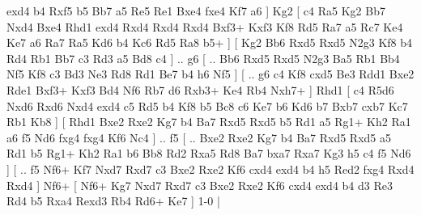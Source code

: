 exd4  b4 Rxf5  b5 Bb7  a5 Re5  Re1 Bxe4  fxe4 Kf7  a6   ]  Kg2 [  c4 Ra5  Kg2 Bb7  Nxd4 Bxe4  Rhd1 exd4  Rxd4 Rxd4  Rxd4 Bxf3+  Kxf3 Kf8  Rd5 Ra7  a5 Rc7  Ke4 Ke7  a6 Ra7  Ra5 Kd6  b4 Kc6  Rd5 Ra8  b5+   ]  [  Kg2 Bb6  Rxd5 Rxd5  N2g3 Kf8  b4 Rd4  Rb1 Bb7  c3 Rd3  a5 Bd8  c4   ] .. g6 [ .. Bb6  Rxd5 Rxd5  N2g3 Ba5  Rb1 Bb4  Nf5 Kf8  c3 Bd3  Ne3 Rd8  Rd1 Be7  b4 h6  Nf5   ]  [ .. g6  c4 Kf8  cxd5 Be3  Rdd1 Bxe2  Rde1 Bxf3+  Kxf3 Bd4  Nf6 Rb7  d6 Rxb3+  Ke4 Rb4  Nxh7+   ]  Rhd1 [  c4 R5d6  Nxd6 Rxd6  Nxd4 exd4  c5 Rd5  b4 Kf8  b5 Bc8  c6 Ke7  b6 Kd6  b7 Bxb7  cxb7 Kc7  Rb1 Kb8   ]  [  Rhd1 Bxe2  Rxe2 Kg7  b4 Ba7  Rxd5 Rxd5  b5 Rd1  a5 Rg1+  Kh2 Ra1  a6 f5  Nd6 fxg4  fxg4 Kf6  Nc4   ] .. f5 [ .. Bxe2  Rxe2 Kg7  b4 Ba7  Rxd5 Rxd5  a5 Rd1  b5 Rg1+  Kh2 Ra1  b6 Bb8  Rd2 Rxa5  Rd8 Ba7  bxa7 Rxa7  Kg3 h5  c4 f5  Nd6   ]  [ .. f5  Nf6+ Kf7  Nxd7 Rxd7  c3 Bxe2  Rxe2 Kf6  cxd4 exd4  b4 h5  Red2 fxg4  Rxd4 Rxd4   ]  Nf6+    [  Nf6+ Kg7  Nxd7 Rxd7  c3 Bxe2  Rxe2 Kf6  cxd4 exd4  b4 d3  Re3 Rd4  b5 Rxa4  Rexd3 Rb4  Rd6+ Ke7   ] 1-0  |
